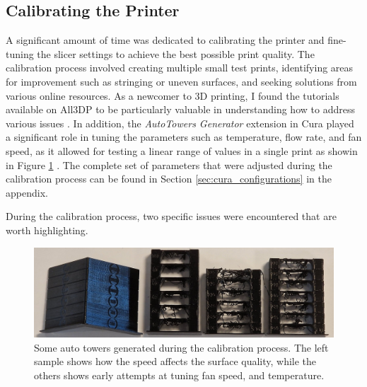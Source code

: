 \subsection{Calibrating the Printer}

A significant amount of time was dedicated to calibrating the printer and fine-tuning the slicer settings to achieve the best possible print quality.
The calibration process involved creating multiple small test prints, identifying areas for improvement such as stringing or uneven surfaces, and seeking solutions from various online resources.
As a newcomer to 3D printing, I found the tutorials available on All3DP to be particularly valuable in understanding how to address various issues \cite{all3dpBasicsArchives}.
In addition, the \textit{AutoTowers Generator} extension in Cura played a significant role in tuning the parameters such as temperature, flow rate, and fan speed, as it allowed for testing a linear range of values in a single print as showin in Figure \ref{fig:auto_towers} \cite{kartchnerAutoTowersGeneratorUltimaker2022}.
The complete set of parameters that were adjusted during the calibration process can be found in Section \ref{sec:cura_configurations} in the appendix.

During the calibration process, two specific issues were encountered that are worth highlighting.

\begin{figure}[H]
    \centering
    \includegraphics[width=\textwidth]{figures/3d_print/auto_towers.jpg}
    \caption{Some auto towers generated during the calibration process.
        The left sample shows how the speed affects the surface quality, while the others shows early attempts at tuning fan speed, and temperature.}
    \label{fig:auto_towers}
\end{figure}


